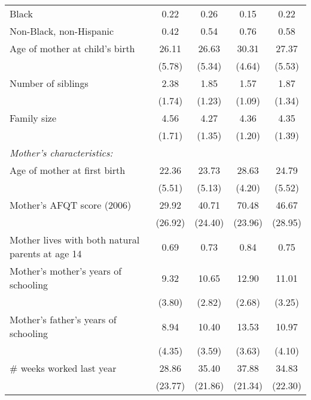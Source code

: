 \begin{table}[!t]
\begin{threeparttable}
\begin{tabular}{l*{4}{c}}
Black               &        0.22&        0.26&        0.15&        0.22\\

Non-Black, non-Hispanic&        0.42&        0.54&        0.76&        0.58\\

Age of mother at child's birth&       26.11&       26.63&       30.31&       27.37\\
                    &      (5.78)&      (5.34)&      (4.64)&      (5.53)\\

Number of siblings  &        2.38&        1.85&        1.57&        1.87\\
                    &      (1.74)&      (1.23)&      (1.09)&      (1.34)\\

Family size         &        4.56&        4.27&        4.36&        4.35\\
                    &      (1.71)&      (1.35)&      (1.20)&      (1.39)\\

\addlinespace
\textit{Mother's characteristics:} & & & & \\
\addlinespace
Age of mother at first birth&       22.36&       23.73&       28.63&       24.79\\
                    &      (5.51)&      (5.13)&      (4.20)&      (5.52)\\

Mother's AFQT score (2006)&       29.92&       40.71&       70.48&       46.67\\
                    &     (26.92)&     (24.40)&     (23.96)&     (28.95)\\

Mother lives with both natural parents at age 14&        0.69&        0.73&        0.84&        0.75\\

Mother's mother's years of schooling&        9.32&       10.65&       12.90&       11.01\\
                    &      (3.80)&      (2.82)&      (2.68)&      (3.25)\\

Mother's father's years of schooling&        8.94&       10.40&       13.53&       10.97\\
                    &      (4.35)&      (3.59)&      (3.63)&      (4.10)\\

$\#$ weeks worked last year&       28.86&       35.40&       37.88&       34.83\\
                    &     (23.77)&     (21.86)&     (21.34)&     (22.30)\\


\end{tabular}
\end{threeparttable}
\end{table}
